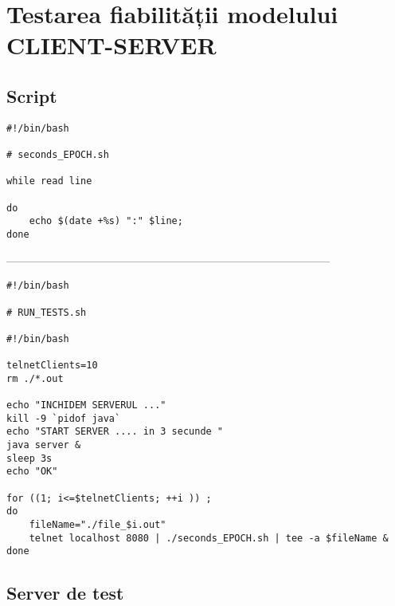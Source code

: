 \appendix
\chapter{Testarea fiabilității modelului CLIENT-SERVER}
\section{Script}

\scriptsize \begin{verbatim}
#!/bin/bash

# seconds_EPOCH.sh

while read line

do
    echo $(date +%s) ":" $line;
done
\end{verbatim}
\par
\par ---------------------------------------------------------------------------------------
\par 
\scriptsize \begin{verbatim}
#!/bin/bash

# RUN_TESTS.sh

#!/bin/bash

telnetClients=10
rm ./*.out

echo "INCHIDEM SERVERUL ..."
kill -9 `pidof java` 
echo "START SERVER .... in 3 secunde "
java server &
sleep 3s
echo "OK" 

for ((1; i<=$telnetClients; ++i )) ; 
do
    fileName="./file_$i.out"
    telnet localhost 8080 | ./seconds_EPOCH.sh | tee -a $fileName &
done
\end{verbatim}

\section{Server de test}

